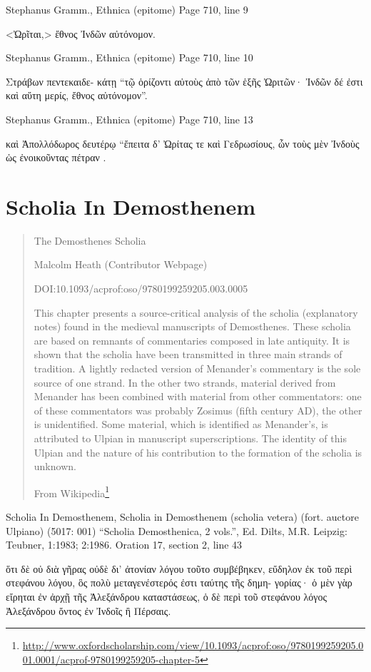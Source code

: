 \documentclass[12pt,letterpaper,twoside,final]{memoir}
\begin{document}
\begin{greek}
Stephanus Gramm., Ethnica (epitome) 
Page 710, line 9

<Ὠρῖται,> ἔθνος Ἰνδῶν αὐτόνομον. 



Stephanus Gramm., Ethnica (epitome) 
Page 710, line 10

                                                Στράβων πεντεκαιδε-
κάτῃ “τῷ ὁρίζοντι αὐτοὺς ἀπὸ τῶν ἑξῆς Ὠριτῶν· Ἰνδῶν δέ 
ἐστι καὶ αὕτη μερίς, ἔθνος αὐτόνομον”. 



Stephanus Gramm., Ethnica (epitome) 
Page 710, line 13

                                                 καὶ Ἀπολλόδωρος 
δευτέρῳ “ἔπειτα δ' Ὠρίτας τε καὶ Γεδρωσίους, ὧν τοὺς μὲν 
Ἰνδοὺς ὡς ἐνοικοῦντας πέτραν . 

\end{greek}


\section{Scholia In Demosthenem}
\blockquote[From Wikipedia\footnote{\url{http://www.oxfordscholarship.com/view/10.1093/acprof:oso/9780199259205.001.0001/acprof-9780199259205-chapter-5}}]{The Demosthenes Scholia

    Malcolm Heath (Contributor Webpage)

DOI:10.1093/acprof:oso/9780199259205.003.0005

This chapter presents a source-critical analysis of the scholia (explanatory notes) found in the medieval manuscripts of Demosthenes. These scholia are based on remnants of commentaries composed in late antiquity. It is shown that the scholia have been transmitted in three main strands of tradition. A lightly redacted version of Menander’s commentary is the sole source of one strand. In the other two strands, material derived from Menander has been combined with material from other commentators: one of these commentators was probably Zosimus (fifth century AD), the other is unidentified. Some material, which is identified as Menander’s, is attributed to Ulpian in manuscript superscriptions. The identity of this Ulpian and the nature of his contribution to the formation of the scholia is unknown.}

\begin{greek}
Scholia In Demosthenem, Scholia in Demosthenem (scholia vetera) (fort. auctore Ulpiano) (5017: 001)
“Scholia Demosthenica, 2 vols.”, Ed. Dilts, M.R.
Leipzig: Teubner, 1:1983; 2:1986.
Oration 17, section 2, line 43

ὅτι δὲ οὐ διὰ γῆρας οὐδὲ δι' ἀτονίαν λόγου τοῦτο συμβέβηκεν, εὔδηλον ἐκ 
τοῦ περὶ στεφάνου λόγου, ὃς πολὺ μεταγενέστερός ἐστι ταύτης τῆς δημη-
γορίας· ὁ μὲν γὰρ εἴρηται ἐν ἀρχῇ τῆς Ἀλεξάνδρου καταστάσεως, ὁ δὲ περὶ 
τοῦ στεφάνου λόγος Ἀλεξάνδρου ὄντος ἐν Ἰνδοῖς ἢ Πέρσαις. 

\end{greek}
\end{document}
